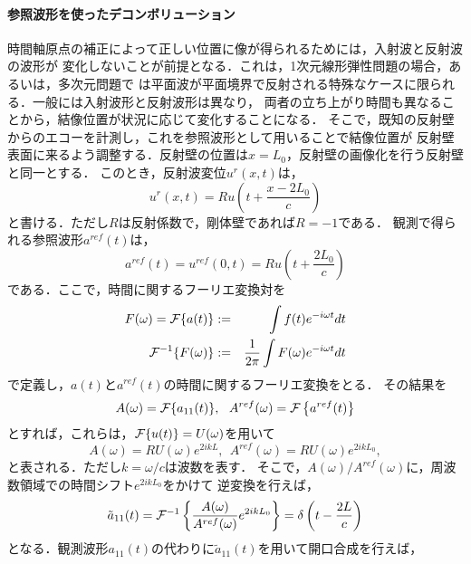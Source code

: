\paragraph{参照波形を使ったデコンボリューション}
時間軸原点の補正によって正しい位置に像が得られるためには，入射波と反射波の波形が
変化しないことが前提となる．これは，1次元線形弾性問題の場合，あるいは，多次元問題で
は平面波が平面境界で反射される特殊なケースに限られる．一般には入射波形と反射波形は異なり，
両者の立ち上がり時間も異なることから，結像位置が状況に応じて変化することになる．
そこで，既知の反射壁からのエコーを計測し，これを参照波形として用いることで結像位置が
反射壁表面に来るよう調整する．反射壁の位置は$x=L_0$，反射壁の画像化を行う反射壁と同一とする．
このとき，反射波変位$u^{r}(x,t)$は，
\begin{equation}
	u^{r}(x,t)=Ru\left(t+\frac{x-2L_0}{c}\right)
	\label{eqn:XXX_14}
\end{equation}
と書ける．ただし$R$は反射係数で，剛体壁であれば$R=-1$である．
観測で得られる参照波形$a^{ref}(t)$は，
\begin{equation}
	a^{ref}(t)=u^{ref}(0,t)=
	Ru\left(t+\frac{2L_0}{c}\right)
	\label{eqn:XXX_15}
\end{equation}
である．ここで，時間に関するフーリエ変換対を
\begin{eqnarray}
	F(\omega)={\cal F}\{ a(t)\} &:=&  \int f(t)e^{-i\omega t} dt \\
	{\cal F}^{-1}\{ F(\omega)\} &:=&  \frac{1}{2\pi} \int F(\omega)e^{-i\omega t} dt 
\end{eqnarray}
で定義し，$a(t)$と$a^{ref}(t)$の時間に関するフーリエ変換をとる．
その結果を
\begin{equation}
	A(\omega)={\cal F}\{a_{11}(t)\}, \ \ 
	A^{ref}(\omega)={\cal F}\left\{ a^{ref}(t)\right\}
	\label{eqn:XXX_16}
\end{equation}
とすれば，これらは，${\cal F}\{ u(t)\}=U(\omega)$を用いて
\begin{equation}
	A(\omega) = RU(\omega) e^{2ik L},  \ \
	A^{ref}(\omega) = RU(\omega) e^{2ik L_0}, 
	\label{eqn:XXX_17}
\end{equation}
と表される．ただし$k=\omega/c$は波数を表す．
そこで，$A(\omega)/A^{ref}(\omega)$に，周波数領域での時間シフト$e^{2ikL_0}$をかけて
逆変換を行えば，
\begin{equation}
	\tilde a_{11}(t)= {\cal F}^{-1} \left\{ 
	\frac{A(\omega)}{A^{ref}(\omega)} e ^{2ik L_0}
	\right\}
	=\delta \left(t-\frac{2L}{c}\right)
	\label{eqn:XXX_at_dcnv}
\end{equation}
となる．観測波形$a_{11}(t)$の代わりに$\tilde a_{11}(t)$を用いて開口合成を行えば，
